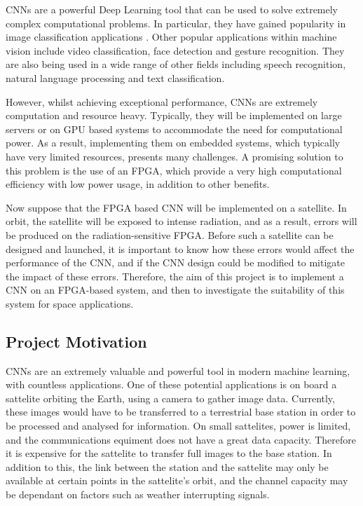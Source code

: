 \documentclass[12pt]{article}
\begin{document}
CNNs are a powerful Deep Learning tool that can be used to solve extremely complex computational problems. In particular, they have gained popularity in image classification applications \cite{ImageNetChallenge}. Other popular applications within machine vision include video classification, face detection and gesture recognition. They are also being used in a wide range of other fields including speech recognition, natural language processing and text classification.

However, whilst achieving exceptional performance, CNNs are extremely computation and resource heavy. Typically, they will be implemented on large servers or on GPU based systems to accommodate the need for computational power. As a result, implementing them on embedded systems, which typically have very limited resources, presents many challenges. A promising solution to this problem is the use of an FPGA, which provide a very high computational efficiency with low power usage, in addition to other benefits.

Now suppose that the FPGA based CNN will be implemented on a satellite. In orbit, the satellite will be exposed to intense radiation, and as a result, errors will be produced on the radiation-sensitive FPGA. Before such a satellite can be designed and launched, it is important to know how these errors would affect the performance of the CNN, and if the CNN design could be modified to mitigate the impact of these errors. Therefore, the aim of this project is to implement a CNN on an FPGA-based system, and then to investigate the suitability of this system for space applications.

\subsection{Project Motivation}
\label{sec:Intro-ProjectMotivation}

CNNs are an extremely valuable and powerful tool in modern machine learning, with countless applications. One of these potential applications is on board a sattelite orbiting the Earth, using a camera to gather image data. Currently, these images would have to be transferred to a terrestrial base station in order to be processed and analysed for information. On small sattelites, power is limited, and the communications equiment does not have a great data capacity. Therefore it is expensive for the sattelite to transfer full images to the base station. In addition to this, the link between the station and the sattelite may only be available at certain points in the sattelite's orbit, and the channel capacity may be dependant on factors such as weather interrupting signals. 
\end{document}
